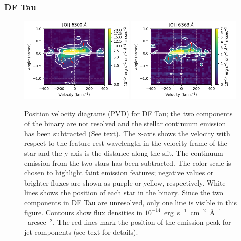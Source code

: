 \documentclass[twocolumn,trackchanges]{aastex63}
\begin{document}
\subsubsection{DF Tau}
\begin{figure}
\begin{center}
\includegraphics[width=0.49\textwidth]{DF_6300.png}
\includegraphics[width=0.49\textwidth]{DF_6363.png}
\caption{Position velocity diagrams (PVD) for DF Tau; the two components of the binary are not resolved and the stellar continuum emission has been subtracted (See text). The x-axis
shows the velocity with respect to the feature rest wavelength in the
velocity frame of the star and the y-axis is the distance along the slit. The
continuum emission from the two stars has been subtracted. The color scale is
chosen to highlight faint emission features; negative values or brighter fluxes
are shown as purple or yellow, respectively. White lines shows the
  position of each star in the binary. Since the two components in DF Tau are unresolved, only one line is visible in this figure. Contours show flux densities in $10^{-14}$~erg~s$^{-1}$~cm$^{-2}$~\AA{}$^{-1}$~arcsec$^{-2}$.
The red lines mark the position of the emission peak for jet components (see text for details).
\label{fig:DFTau}}
\end{center}
\end{figure}
\end{document}
